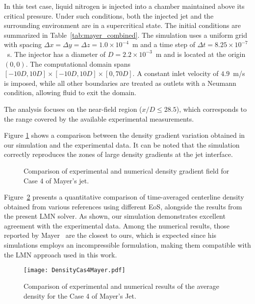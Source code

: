 In this test case, liquid nitrogen is injected into a chamber maintained above
its critical pressure. Under such conditions, both the injected jet and the
surrounding environment are in a supercritical state. The initial conditions are
summarized in Table~\ref{tab:mayer_combined}. The simulation uses a uniform grid
with spacing $\Delta x = \Delta y = \Delta z = 1.0\times 10^{-4}$~m and a time
step of $\Delta t = 8.25\times 10^{-7}$~s. The injector has a diameter of $D =
2.2\times 10^{-3}$~m and is located at the origin $(0,0)$. The computational
domain spans $[-10D,10D]\times[-10D,10D]\times[0,70D]$. A constant inlet
velocity of $4.9$~m/s is imposed, while all other boundaries are treated as
outlets with a Neumann condition, allowing fluid to exit the domain.

The analysis focuses on the near-field region ($x/D \leq 28.5$), which
corresponds to the range covered by the available experimental measurements.


Figure \ref{Density Field Mayer Cas 4} shows a comparison between the density
gradient variation obtained in our simulation and the experimental data. It can
be noted that the simulation correctly reproduces the zones of large density
gradients at the jet interface. 

\begin{figure}[H]
    \centering
    \hfill {}\hfill
    \caption{Comparison of experimental and numerical density gradient field for Case 4 of Mayer's jet.}
    \label{Density Field Mayer Cas 4}
\end{figure}

Figure~\ref{Mayers jet cas 4} presents a quantitative comparison of
time-averaged centerline density obtained from various references using
different EoS, alongside the results from the present LMN solver. As shown, our
simulation demonstrates excellent agreement with the experimental data. Among
the numerical results, those reported by Mayer~\cite{mayer2003raman} are the
closest to ours, which is expected since his simulations employs an
incompressible formulation, making them compatible with the LMN approach used in
this work.


\begin{figure}[htpb]
\centering
\texttt{[image: DensityCas4Mayer.pdf]}
\caption{Comparison of experimental and numerical results of the average density for the Case 4 of Mayer's Jet. }
\label{Mayers jet cas 4}
\end{figure}